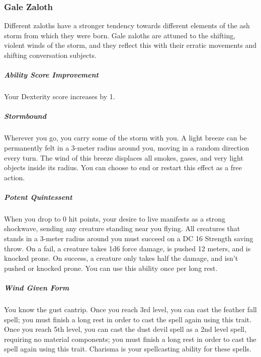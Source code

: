 \begin{linenumbers}
\subsubsection{Gale Zaloth}
Different zaloths have a stronger tendency towards different elements of the ash storm from which they were born.
Gale zaloths are attuned to the shifting, violent winds of the storm, and they reflect this with their erratic movements and shifting conversation subjects.
\subparagraph{Ability Score Improvement} Your Dexterity score increases by 1.
\subparagraph{Stormbound} Wherever you go, you carry some of the storm with you.
A light breeze can be permanently felt in a 3-meter radius around you, moving in a random direction every turn.
The wind of this breeze displaces all smokes, gases, and very light objects inside its radius.
You can choose to end or restart this effect as a free action.
\subparagraph{Potent Quintessent} When you drop to 0 hit points, your desire to live manifests as a strong shockwave, sending any creature standing near you flying.
All creatures that stands in a 3-meter radius around you must succeed on a DC 16 Strength saving throw.
On a fail, a creature takes 1d6 force damage, is pushed 12 meters, and is knocked prone.
On success, a creature only takes half the damage, and isn't pushed or knocked prone.
You can use this ability once per long rest.
\subparagraph{Wind Given Form} You know the gust cantrip.
Once you reach 3rd level, you can cast the feather fall spell; you must finish a long rest in order to cast the spell again using this trait.
Once you reach 5th level, you can cast the dust devil spell as a 2nd level spell, requiring no material components; you must finish a long rest in order to cast the spell again using this trait.
Charisma is your spellcasting ability for these spells.


\end{linenumbers}
